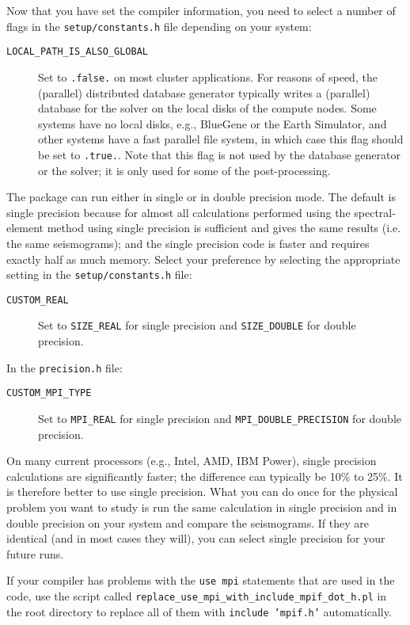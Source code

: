 Now that you have set the compiler information, you need to select
a number of flags in the \texttt{setup/constants.h} file depending on your
system:
\begin{description}
\item [{\texttt{LOCAL\_PATH\_IS\_ALSO\_GLOBAL}}] Set to \texttt{.false.}
on most cluster applications. For reasons of speed, the (parallel)
distributed database generator typically writes a (parallel) database
for the solver on the local disks of the compute nodes. Some systems
have no local disks, e.g., BlueGene or the Earth Simulator, and other
systems have a fast parallel file system, in which case this flag
should be set to \texttt{.true.}. Note that this flag is not used
by the database generator or the solver; it is only used for some
of the post-processing.
\end{description}
%
The package can run either in single or in double precision mode.
The default is single precision because for almost all calculations
performed using the spectral-element method using single precision
is sufficient and gives the same results (i.e. the same seismograms);
and the single precision code is faster and requires exactly half
as much memory. Select your preference by selecting the appropriate
setting in the \texttt{setup/constants.h} file:
\begin{description}
\item [{\texttt{CUSTOM\_REAL}}] Set to \texttt{SIZE\_REAL} for single precision
and \texttt{SIZE\_DOUBLE} for double precision.
\end{description}
%
In the \texttt{precision.h} file:
\begin{description}
\item [{\texttt{CUSTOM\_MPI\_TYPE}}] Set to \texttt{MPI\_REAL} for single
precision and \texttt{MPI\_DOUBLE\_PRECISION} for double precision.
\end{description}
%
On many current processors (e.g., Intel, AMD, IBM Power), single precision
calculations are significantly faster; the difference can typically
be 10\% to 25\%. It is therefore better to use single precision. What
you can do once for the physical problem you want to study is run
the same calculation in single precision and in double precision on
your system and compare the seismograms. If they are identical (and
in most cases they will), you can select single precision for your
future runs.\newline

If your compiler has problems with the \texttt{use mpi} statements that are used in the code, use the script called
\texttt{replace\_use\_mpi\_with\_include\_mpif\_dot\_h.pl} in the root directory to replace all of them with \texttt{include 'mpif.h'} automatically.



